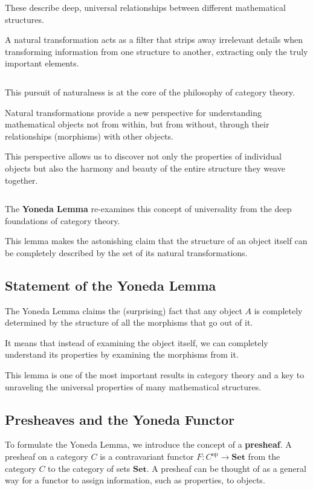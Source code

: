 \documentclass[uplatex,a4j,12pt,dvipdfmx]{jsarticle}
\begin{document}
${}$

These describe deep, universal relationships between different mathematical structures.

A natural transformation acts as a filter that strips away irrelevant details when transforming information from one structure to another, extracting only the truly important elements.

	${}$

This pursuit of naturalness is at the core of the philosophy of category theory.

Natural transformations provide a new perspective for understanding mathematical objects not from within, but from without, through their relationships (morphisms) with other objects.

This perspective allows us to discover not only the properties of individual objects but also the harmony and beauty of the entire structure they weave together.

	${}$

The \textbf{Yoneda Lemma} re-examines this concept of universality from the deep foundations of category theory.

This lemma makes the astonishing claim that the structure of an object itself can be completely described by the set of its natural transformations.

\subsection{Statement of the Yoneda Lemma}

The Yoneda Lemma claims the (surprising) fact that any object $A$ is completely determined by the structure of all the morphisms that go out of it.

It means that instead of examining the object itself, we can completely understand its properties by examining the morphisms from it.

This lemma is one of the most important results in category theory and a key to unraveling the universal properties of many mathematical structures.


\subsection{Presheaves and the Yoneda Functor}
To formulate the Yoneda Lemma, we introduce the concept of a \textbf{presheaf}.
A presheaf on a category $C$ is a contravariant functor $F: C^{\text{op}} \to \mathbf{Set}$ from the category $C$ to the category of sets $\mathbf{Set}$.
A presheaf can be thought of as a general way for a functor to assign information, such as properties, to objects.
\end{document}
